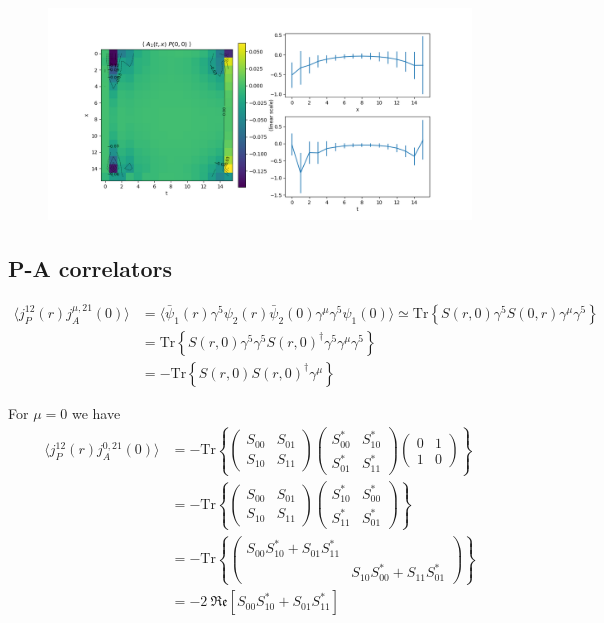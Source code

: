 \documentclass{article}
\newcommand{\Tr}[1]{\text{Tr}\left\{ #1 \right\}}
\renewcommand{\Re}[1]{\mathfrak{Re}\left[ #1 \right]}
\begin{document}
\begin{figure}[H]
    \centering
    \includegraphics[width=\textwidth]{../plots/A1P.png}
    \caption{}
    \label{}
\end{figure}

\subsection{P-A correlators}

\begin{align*}
    \langle j_P^{12} (r) j_A^{\mu, 21}(0) \rangle &= \langle \bar\psi_1(r) \gamma^5 \psi_2(r) \bar\psi_2(0) \gamma^\mu \gamma^5 \psi_1(0) \rangle 
    \simeq \Tr{S(r, 0)  \gamma^5 S(0, r) \gamma^\mu \gamma^5} \\
    &= \Tr{S(r, 0)  \gamma^5 \gamma^5 S(r, 0)^\dagger \gamma^5 \gamma^\mu \gamma^5} \\
    &= -\Tr{S(r, 0) S(r, 0)^\dagger \gamma^\mu}
\end{align*}

For $\mu = 0$ we have
\begin{align*}
    \langle j_P^{12} (r) j_A^{0, 21}(0) \rangle
    &= - \Tr{ \begin{pmatrix} S_{00} & S_{01} \\ S_{10} & S_{11} \end{pmatrix} \begin{pmatrix} S_{00}^* & S_{10}^* \\ S_{01}^* & S_{11}^* \end{pmatrix} \begin{pmatrix} 0 & 1 \\ 1 & 0 \end{pmatrix} } \\
    &= - \Tr{ \begin{pmatrix} S_{00} & S_{01} \\ S_{10} & S_{11} \end{pmatrix} \begin{pmatrix} S_{10}^* & S_{00}^* \\ S_{11}^* & S_{01}^* \end{pmatrix}} \\
    &= - \Tr{\begin{pmatrix} S_{00} S_{10}^* + S_{01} S_{11}^* &  \\ & S_{10} S_{00}^* + S_{11} S_{01}^* \end{pmatrix}} \\
    &= -2 \ \Re{S_{00} S_{10}^* + S_{01} S_{11}^*}
\end{align*}
\end{document}
